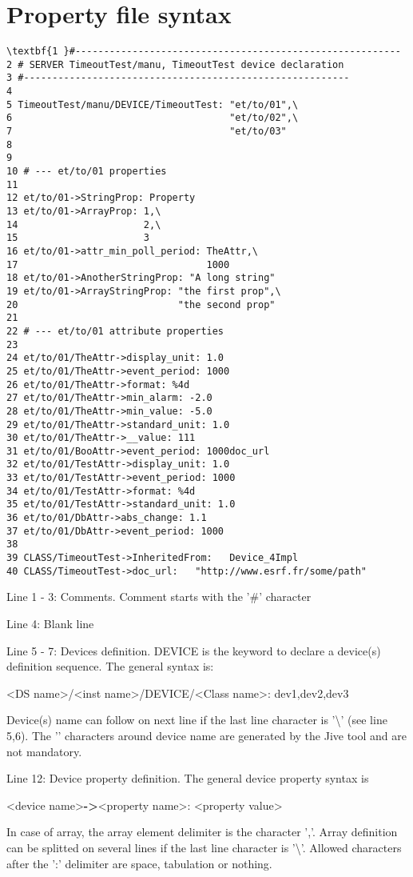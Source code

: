 \section{Property file syntax}


\begin{verbatim}
\textbf{1 }#---------------------------------------------------------
2 # SERVER TimeoutTest/manu, TimeoutTest device declaration
3 #---------------------------------------------------------
4 
5 TimeoutTest/manu/DEVICE/TimeoutTest: "et/to/01",\ 
6                                      "et/to/02",\ 
7                                      "et/to/03"
8 
9 
10 # --- et/to/01 properties
11 
12 et/to/01->StringProp: Property
13 et/to/01->ArrayProp: 1,\ 
14                      2,\ 
15                      3
16 et/to/01->attr_min_poll_period: TheAttr,\ 
17                                 1000
18 et/to/01->AnotherStringProp: "A long string"
19 et/to/01->ArrayStringProp: "the first prop",\ 
20                            "the second prop"
21 
22 # --- et/to/01 attribute properties
23 
24 et/to/01/TheAttr->display_unit: 1.0
25 et/to/01/TheAttr->event_period: 1000
26 et/to/01/TheAttr->format: %4d
27 et/to/01/TheAttr->min_alarm: -2.0
28 et/to/01/TheAttr->min_value: -5.0
29 et/to/01/TheAttr->standard_unit: 1.0
30 et/to/01/TheAttr->__value: 111
31 et/to/01/BooAttr->event_period: 1000doc_url
32 et/to/01/TestAttr->display_unit: 1.0
33 et/to/01/TestAttr->event_period: 1000
34 et/to/01/TestAttr->format: %4d
35 et/to/01/TestAttr->standard_unit: 1.0
36 et/to/01/DbAttr->abs_change: 1.1
37 et/to/01/DbAttr->event_period: 1000
38
39 CLASS/TimeoutTest->InheritedFrom:   Device_4Impl
40 CLASS/TimeoutTest->doc_url:   "http://www.esrf.fr/some/path"
\end{verbatim}


Line 1 - 3: Comments. Comment starts with the '\#' character

Line 4: Blank line

Line 5 - 7: Devices definition. \textquotedbl{}DEVICE\textquotedbl{}
is the keyword to declare a device(s) definition sequence. The general
syntax is:\begin{center}<DS name>/<inst name>/DEVICE/<Class name>:
dev1,dev2,dev3\end{center}Device(s) name can follow on next line
if the last line character is '\textbackslash{}' (see line 5,6). The
'\textquotedbl{}' characters around device name are generated by the
Jive tool and are not mandatory.

Line 12: Device property definition. The general device property syntax
is \begin{center}<device name>\textbf{->}<property name>: <property
value>\end{center}In case of array, the array element delimiter is
the character ','. Array definition can be splitted on several lines
if the last line character is '\textbackslash{}'. Allowed characters
after the ':' delimiter are space, tabulation or nothing.

